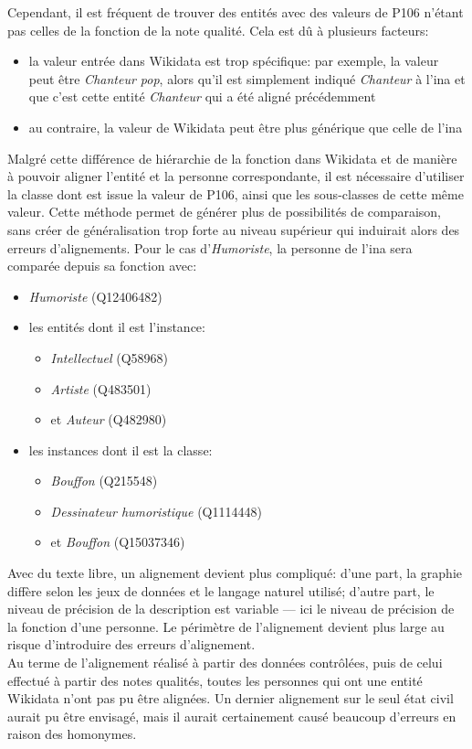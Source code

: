 Cependant, il est fréquent de trouver des entités avec des valeurs de P106 n'étant pas celles de la fonction de la note qualité. Cela est dû à plusieurs facteurs:
\begin{itemize}
	\item la valeur entrée dans Wikidata est trop spécifique: par exemple, la valeur peut être \textit{Chanteur pop}, alors qu'il est simplement indiqué \textit{Chanteur} à l'\ac{ina} et que c'est cette entité \textit{Chanteur} qui a été aligné précédemment
	\item au contraire, la valeur de Wikidata peut être plus générique que celle de l'\ac{ina}
\end{itemize}
Malgré cette différence de hiérarchie de la fonction dans Wikidata et de manière à pouvoir aligner l'entité et la personne correspondante, il est nécessaire d'utiliser la classe dont est issue la valeur de P106, ainsi que les sous-classes de cette même valeur. Cette méthode permet de générer plus de possibilités de comparaison, sans créer de généralisation trop forte au niveau supérieur qui induirait alors des erreurs d'alignements. Pour le cas d'\textit{Humoriste}, la personne de l'\ac{ina} sera comparée depuis sa fonction avec:
\begin{itemize}
	\item \textit{Humoriste} (Q12406482)
	\item les entités dont il est l'instance:
	\begin{itemize}
		\item \textit{Intellectuel} (Q58968)
		\item \textit{Artiste} (Q483501)
		\item et \textit{Auteur} (Q482980)
	\end{itemize}
	\item les instances dont il est la classe:
	\begin{itemize}
		\item \textit{Bouffon} (Q215548)
		\item \textit{Dessinateur humoristique} (Q1114448)
		\item et \textit{Bouffon} (Q15037346)
	\end{itemize}
\end{itemize}


\bigskip
\bigskip
Avec du texte libre, un alignement devient plus compliqué: d'une part, la graphie diffère selon les jeux de données et le langage naturel utilisé; d'autre part, le niveau de précision de la description est variable --- ici le niveau de précision de la fonction d'une personne. Le périmètre de l'alignement devient plus large au risque d'introduire des erreurs d'alignement. \\

Au terme de l'alignement réalisé à partir des données contrôlées, puis de celui effectué à partir des notes qualités, toutes les personnes qui ont une entité Wikidata n'ont pas pu être alignées. Un dernier alignement sur le seul état civil aurait pu être envisagé, mais il aurait certainement causé beaucoup d'erreurs en raison des homonymes.